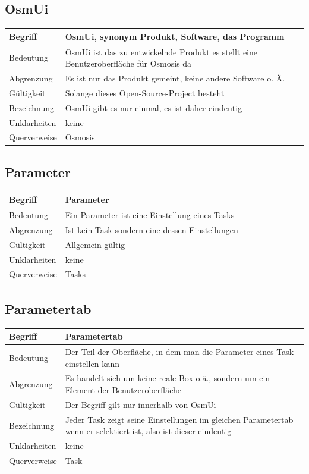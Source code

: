 \documentclass[a4paper,12pt]{scrartcl}
\begin{document}
\begin{center}
\subsection{OsmUi}
\begin{tabular}{|p{5cm}|p{10cm}|}
\hline Begriff & \textbf{OsmUi}, synonym Produkt, Software, das Programm \\ 
\hline Bedeutung & OsmUi ist das zu entwickelnde Produkt es stellt eine Benutzeroberfläche für Osmosis da \\ 
\hline Abgrenzung & Es ist nur das Produkt gemeint, keine andere Software o. Ä. \\ 
\hline Gültigkeit & Solange dieses Open-Source-Project besteht \\ 
\hline Bezeichnung & OsmUi gibt es nur einmal, es ist daher eindeutig \\ 
\hline Unklarheiten & keine \\ 
\hline Querverweise & Osmosis \\ 
\hline 
\end{tabular}
\subsection{Parameter}
\begin{tabular}{|p{5cm}|p{10cm}|}
\hline Begriff & \textbf{Parameter} \\ 
\hline Bedeutung & Ein Parameter ist eine Einstellung eines Tasks\\
\hline Abgrenzung & Ist kein Task sondern eine dessen Einstellungen\\ 
\hline Gültigkeit & Allgemein gültig\\  
\hline Unklarheiten & keine \\ 
\hline Querverweise & Tasks \\ 
\hline 
\end{tabular}
\subsection{Parametertab}
\begin{tabular}{|p{5cm}|p{10cm}|}
\hline Begriff & \textbf{Parametertab} \\ 
\hline Bedeutung & Der Teil der Oberfläche, in dem man die Parameter eines Task einstellen kann  \\ 
\hline Abgrenzung & Es handelt sich um keine reale Box o.ä., sondern um ein Element der Benutzeroberfläche\\ 
\hline Gültigkeit & Der Begriff gilt nur innerhalb von OsmUi \\ 
\hline Bezeichnung & Jeder Task zeigt seine Einstellungen im gleichen Parametertab wenn er selektiert ist, also ist dieser eindeutig \\ 
\hline Unklarheiten & keine \\ 
\hline Querverweise & Task \\ 
\hline 
\end{tabular}

\end{center}
\end{document}
